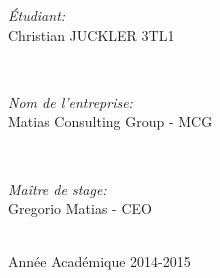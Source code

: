 \begin{titlepage}
\begin{minipage}{0.4\textwidth}
\begin{flushleft} \large
\emph{\'Etudiant:}\\
Christian \textsc{JUCKLER} 3TL1 %
\end{flushleft}
\end{minipage}\\[1cm]
\begin{minipage}{0.4\textwidth}
\begin{flushleft} \large
\emph{Nom de l'entreprise:} \\
Matias Consulting Group - MCG %
\end{flushleft}
\end{minipage}\\[1cm]
\begin{minipage}{0.4\textwidth}
\begin{flushleft} \large
\emph{Maître de stage:} \\
Gregorio Matias - CEO %
\end{flushleft}
\end{minipage}\\[4cm]



{\large Année Académique 2014-2015}\\[3cm] %

\vfill %

\end{titlepage}